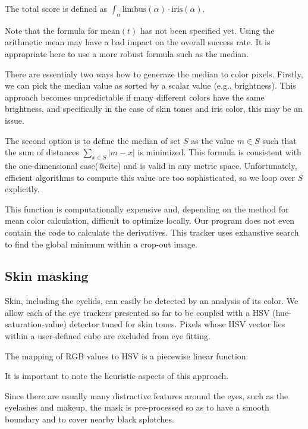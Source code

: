 The total score is defined as $\int_\alpha \textrm{limbus}(\alpha) \cdot \textrm{iris}(\alpha)$.

Note that the formula for $\textrm{mean}(t)$ has not been specified yet.
Using the arithmetic mean may have a bad impact on the overall success rate.
It is appropriate here to use a more robust formula such as the median.

There are essentialy two ways how to generaze the median to color pixels.
Firstly, we can pick the median value as sorted by a scalar value (e.g., brightness).
This approach becomes unpredictable if many different colors have the same brightness, and specifically in the case of skin tones and iris color, this may be an issue.

The second option is to define the median of set $S$ as the value $m \in S$ such that the sum of distances $\sum_{x \in S} |m - x|$ is minimized.
This formula is consistent with the one-dimensional case(@cite) and is valid in any metric space.
Unfortunately, efficient algorithms to compute this value are too sophisticated, so we loop over $S$ explicitly.

This function is computationally expensive and, depending on the method for mean color calculation, difficult to optimize locally.
Our program does not even contain the code to calculate the derivatives.
This tracker uses exhaustive search to find the global minimum within a crop-out image.

\subsection{Skin masking}

Skin, including the eyelids, can easily be detected by an analysis of its color.
We allow each of the eye trackers presented so far to be coupled with a HSV (hue-saturation-value) detector tuned for skin tones.
Pixels whose HSV vector lies within a user-defined cube are excluded from eye fitting.

The mapping of RGB values to HSV is a piecewise linear function:

It is important to note the heuristic aspects of this approach.

Since there are usually many distractive features around the eyes, such as the eyelashes and makeup, the mask is pre-processed so as to have a smooth boundary and to cover nearby black splotches.


